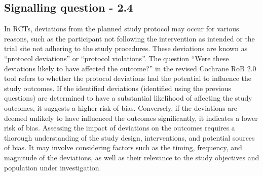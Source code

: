 \documentclass[sn-mathphys,Numbered]{sn-jnl}%
\begin{document}
\subsection*{Signalling question - 2.4 }
%
In RCTs, deviations from the planned study protocol may occur for various reasons, such as the participant not following the intervention as intended or the trial site not adhering to the study procedures.
These deviations are known as ``protocol deviations'' or ``protocol violations''.
The question ``Were these deviations likely to have affected the outcome?'' in the revised Cochrane RoB 2.0 tool refers to whether the protocol deviations had the potential to influence the study outcomes.
If the identified deviations (identified using the previous questions) are determined to have a substantial likelihood of affecting the study outcomes, it suggests a higher risk of bias. 
Conversely, if the deviations are deemed unlikely to have influenced the outcomes significantly, it indicates a lower risk of bias.
Assessing the impact of deviations on the outcomes requires a thorough understanding of the study design, interventions, and potential sources of bias.
It may involve considering factors such as the timing, frequency, and magnitude of the deviations, as well as their relevance to the study objectives and population under investigation.
\end{document}
